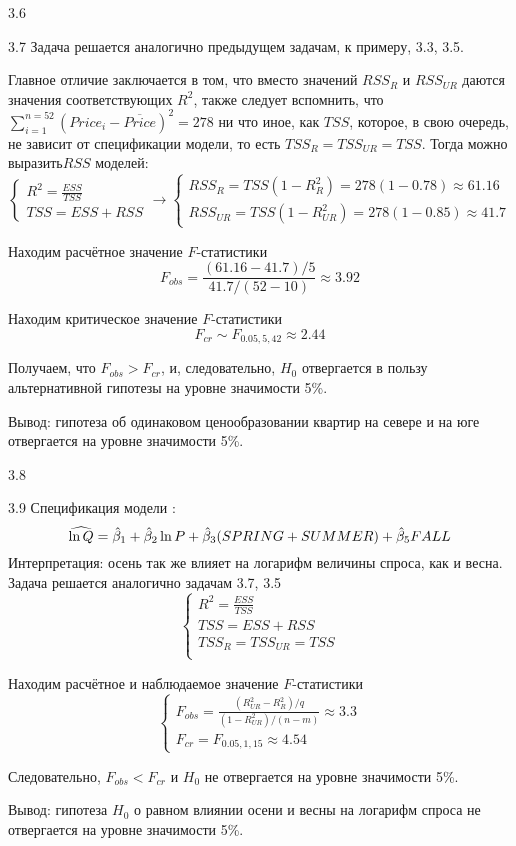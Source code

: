 \protect \hypertarget {soln:3.6}{}
\begin{solution}{{3.6}}
\end{solution}
\protect \hypertarget {soln:3.7}{}
\begin{solution}{{3.7}}
Задача решается аналогично предыдущем задачам, к примеру, 3.3, 3.5.

Главное отличие заключается в том, что вместо значений $RSS_{R}$ и $RSS_{UR}$ даются значения соответствующих $R^2$, также следует вспомнить, что $\sum_{i=1}^{n=52}(Price_i-\overline{Price})^2=278$ ни что иное, как $TSS$, которое, в свою очередь, не зависит от спецификации модели, то есть $TSS_R=TSS_{UR}=TSS$. Тогда можно выразить$RSS$ моделей:
\[
\begin{cases}
R^2=\frac{ESS}{TSS} \\
TSS=ESS+RSS
\end{cases}
\to
\begin{cases}
RSS_R=TSS(1-R^2_R)=278(1-0.78)\approx 61.16\\
RSS_{UR}=TSS(1-R^2_{UR})=278(1-0.85)\approx 41.7
\end{cases}
\]

Находим расчётное значение $F$-статистики
\[
F_{obs}=\frac{(61.16-41.7)/5}{41.7/(52-10)}\approx 3.92
\]

Находим критическое значение $F$-статистики
\[
F_{cr}\sim F_{0.05,5,42}\approx 2.44
\]

Получаем, что $F_{obs}>F_{cr}$, и, следовательно, $H_0$ отвергается в пользу альтернативной гипотезы на уровне значимости 5\%.


Вывод: гипотеза об одинаковом ценообразовании квартир на севере и на юге отвергается на уровне значимости 5\%.
\end{solution}
\protect \hypertarget {soln:3.8}{}
\begin{solution}{{3.8}}
\end{solution}
\protect \hypertarget {soln:3.9}{}
\begin{solution}{{3.9}}
Спецификация модели :
\[
\widehat{\ln{Q}} = \hat{\beta}_1+\hat{\beta}_2 \ln{P}+\hat{\beta}_3(SPRING+SUMMER)+\hat{\beta}_5 FALL
\]
Интерпретация: осень так же влияет на логарифм величины спроса, как и весна. Задача решается аналогично задачам 3.7, 3.5
\[
\begin{cases}
R^2=\frac{ESS}{TSS}\\
TSS=ESS+RSS\\
TSS_R=TSS_{UR}=TSS\\
\end{cases}
\]

Находим расчётное и наблюдаемое значение $F$-статистики
\[
\begin{cases}
F_{obs}=\frac{(R_{UR}^2-R_{R}^2)/q}{(1-R^2_{UR})/(n-m)}\approx3.3\\
F_{cr}= F_{0.05,1,15}\approx 4.54
\end{cases}
\]

Следовательно, $F_{obs}<F_{cr}$ и $H_0$ не отвергается на уровне значимости 5\%.

Вывод: гипотеза $H_0$ о равном влиянии осени и весны на логарифм спроса не отвергается на уровне значимости 5\%.
\end{solution}
